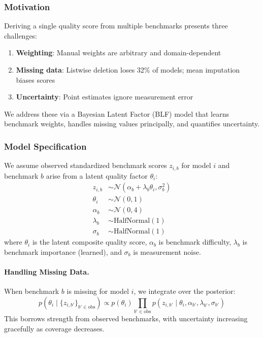 \subsubsection{Motivation}

Deriving a single quality score from multiple benchmarks presents three challenges:
%
\begin{enumerate}[nosep]
\item \textbf{Weighting}: Manual weights are arbitrary and domain-dependent
\item \textbf{Missing data}: Listwise deletion loses 32\% of models; mean imputation biases scores
\item \textbf{Uncertainty}: Point estimates ignore measurement error
\end{enumerate}
%
We address these via a Bayesian Latent Factor (BLF) model that learns benchmark weights, handles missing values principally, and quantifies uncertainty.

\subsubsection{Model Specification}

We assume observed standardized benchmark scores $z_{i,b}$ for model $i$ and benchmark $b$ arise from a latent quality factor $\theta_i$:
%
\begin{align}
z_{i,b} &\sim \mathcal{N}(\alpha_b + \lambda_b \theta_i, \sigma_b^2) \\
\theta_i &\sim \mathcal{N}(0, 1) \\
\alpha_b &\sim \mathcal{N}(0, 4) \\
\lambda_b &\sim \text{HalfNormal}(1) \\
\sigma_b &\sim \text{HalfNormal}(1)
\end{align}
%
where $\theta_i$ is the latent composite quality score, $\alpha_b$ is benchmark difficulty, $\lambda_b$ is benchmark importance (learned), and $\sigma_b$ is measurement noise.

\paragraph{Handling Missing Data.}
When benchmark $b$ is missing for model $i$, we integrate over the posterior:
%
\begin{equation}
p(\theta_i \mid \{z_{i,b'}\}_{b' \in \text{obs}}) \propto p(\theta_i) \prod_{b' \in \text{obs}} p(z_{i,b'} \mid \theta_i, \alpha_{b'}, \lambda_{b'}, \sigma_{b'})
\end{equation}
%
This borrows strength from observed benchmarks, with uncertainty increasing gracefully as coverage decreases.

